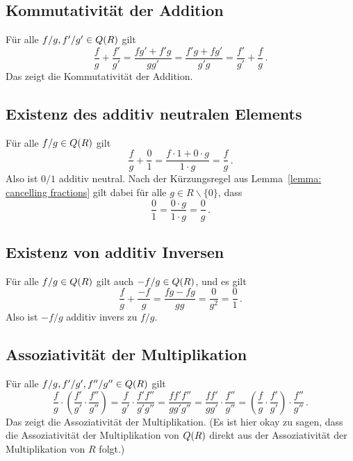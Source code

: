 \subsection*{Kommutativität der Addition}

Für alle $f/g, f'/g' \in Q(R)$ gilt
\[
    \frac{f}{g} + \frac{f'}{g'}
  = \frac{f g' + f' g}{g g'}
  = \frac{f' g + f g'}{g' g}
  = \frac{f'}{g'} + \frac{f}{g} \,.
\]
Das zeigt die Kommutativität der Addition.





\subsection*{Existenz des additiv neutralen Elements}

Für alle $f/g \in Q(R)$ gilt
\[
    \frac{f}{g}
  + \frac{0}{1}
  = \frac{f \cdot 1 + 0 \cdot g}{1 \cdot g}
  = \frac{f}{g} \,.
\]
Also ist $0/1$ additiv neutral.
Nach der Kürzungsregel aus Lemma~\ref{lemma: cancelling fractions} gilt dabei für alle $g \in R \smallsetminus \{0\}$, dass
\[
    \frac{0}{1}
  = \frac{0 \cdot g}{1 \cdot g}
  = \frac{0}{g} \,.
\]





\subsection*{Existenz von additiv Inversen}

Für alle $f/g \in Q(R)$ gilt auch $-f/g \in Q(R)$, und es gilt
\[
    \frac{f}{g} + \frac{-f}{g}
  = \frac{f g - f g}{g g}
  = \frac{0}{g^2}
  = \frac{0}{1} \,.
\]
Also ist $-f/g$ additiv invers zu $f/g$.





\subsection*{Assoziativität der Multiplikation}

Für alle $f/g, f'/g', f''/g'' \in Q(R)$ gilt
\[
    \frac{f}{g} \cdot \left( \frac{f'}{g'} \cdot \frac{f''}{g''} \right)
  = \frac{f}{g'} \cdot \frac{f' f''}{g' g''}
  = \frac{f f' f''}{g g' g''}
  = \frac{f f'}{g g'} \cdot \frac{f''}{g''}
  = \left( \frac{f}{g} \cdot \frac{f'}{g'} \right) \cdot \frac{f''}{g''} \,.
\]
Das zeigt die Assoziativität der Multiplikation.
(Es ist hier okay zu sagen, dass die Assoziativität der Multiplikation von $Q(R)$ direkt aus der Assoziativität der Multiplikation von $R$ folgt.)





